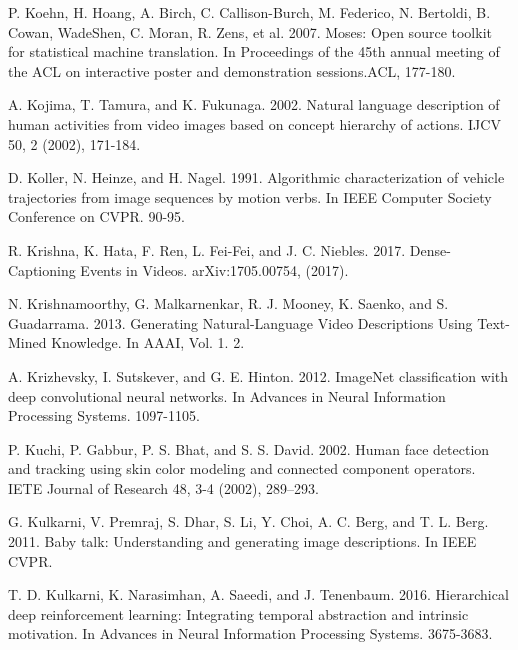 \documentclass[10pt,journal,compsoc]{IEEEtran}
\begin{document}
\begin{thebibliography}{1}
P. Koehn, H. Hoang, A. Birch, C. Callison-Burch, M. Federico, N. Bertoldi, B. Cowan, WadeShen, C. Moran, R. Zens, et al. 2007. Moses: Open source toolkit for statistical machine translation. In Proceedings of the 45th annual meeting of the ACL on interactive poster and demonstration sessions.ACL, 177-180.

A. Kojima, T. Tamura, and K. Fukunaga. 2002. Natural language description of human activities from video images based on concept hierarchy of actions. IJCV 50, 2 (2002), 171-184.

D. Koller, N. Heinze, and H. Nagel. 1991. Algorithmic characterization of vehicle trajectories from image sequences by motion verbs. In IEEE Computer Society Conference on CVPR. 90-95.

R. Krishna, K. Hata, F. Ren, L. Fei-Fei, and J. C. Niebles. 2017. Dense-Captioning Events in Videos. arXiv:1705.00754, (2017).

N. Krishnamoorthy, G. Malkarnenkar, R. J. Mooney, K. Saenko, and S. Guadarrama. 2013.
Generating Natural-Language Video Descriptions Using Text-Mined Knowledge. In AAAI, Vol. 1. 2.

A. Krizhevsky, I. Sutskever, and G. E. Hinton. 2012. ImageNet classification with deep convolutional neural networks. In Advances in Neural Information Processing Systems. 1097-1105.


P. Kuchi, P. Gabbur, P. S. Bhat, and S. S. David. 2002. Human face detection and tracking using
skin color modeling and connected component operators. IETE Journal of Research 48, 3-4 (2002), 289–293.

G. Kulkarni, V. Premraj, S. Dhar, S. Li, Y. Choi, A. C. Berg, and T. L. Berg. 2011. Baby talk: Understanding and generating image descriptions. In IEEE CVPR.

T. D. Kulkarni, K. Narasimhan, A. Saeedi, and J. Tenenbaum. 2016. Hierarchical deep reinforcement learning: Integrating temporal abstraction and intrinsic motivation. In Advances in Neural Information Processing Systems. 3675-3683.


\end{thebibliography}
\end{document}
